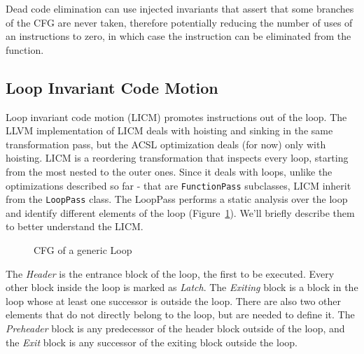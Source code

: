 Dead code elimination can use injected invariants that assert that some branches of the CFG are never taken, therefore potentially reducing the number of uses of an instructions to zero, in which case the instruction can be eliminated from the function.

\subsection{Loop Invariant Code Motion}
\label{sub:licm}

Loop invariant code motion (LICM) promotes instructions out of the loop. The LLVM implementation of LICM deals with hoisting and sinking in the same transformation pass, but the ACSL optimization deals (for now) only with hoisting. LICM is a reordering transformation that inspects every loop, starting from the most nested to the outer ones. Since it deals with loops, unlike the optimizations described so far - that are \texttt{FunctionPass} subclasses, LICM inherit from the \texttt{LoopPass} class. The LoopPass performs a static analysis over the loop and identify different elements of the loop (Figure~\ref{fig:loopcfg}). We'll briefly describe them to better understand the LICM.

\begin{figure}[t]
  \begin{mdframed}
  \centering
  \end{mdframed}
  \caption{CFG of a generic Loop}
  \label{fig:loopcfg}
\end{figure}

The \emph{Header} is the entrance block of the loop, the first to be executed. Every other block inside the loop is marked as \emph{Latch}. The \emph{Exiting} block is a block in the loop whose at least one successor is outside the loop. There are also two other elements that do not directly belong to the loop, but are needed to define it. The \emph{Preheader} block is any predecessor of the header block outside of the loop, and the \emph{Exit} block is any successor of the exiting block outside the loop.

